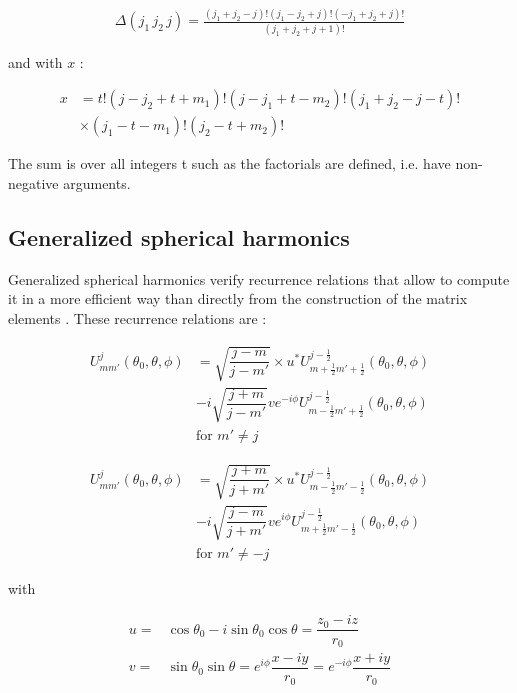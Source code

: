 \documentclass[12pt]{article}
\begin{document}
\begin{eqnarray}
\Delta \left(j_1\, j_2\, j\right) = \frac{\left(j_1+j_2-j\right)! \left(j_1-j_2+j\right)! \left(-j_1+j_2+j\right)!}{\left(j_1+j_2+j+1\right)!}
\end{eqnarray}

and with $x$ :

\begin{eqnarray}
x & =t!\left(j-j_2+t+m_1\right)! \left(j-j_1+t-m_2\right)! \left(j_1+j_2-j-t\right)! \\
& \times \left(j_1-t-m_1\right)! \left(j_2-t+m_2 \right)! \nonumber
\end{eqnarray}

The sum is over all integers t such as the factorials are defined, i.e. have non-negative arguments.

 \subsection{Generalized spherical harmonics}

Generalized spherical harmonics verify recurrence relations that allow to compute it in a more efficient way than directly from the construction of the matrix elements \cite{Bartok_01}. These recurrence relations are :

\begin{eqnarray} \label{eqn:gsh_b7}
U^j_{m m'}\left(\theta_0,\theta,\phi\right) & =\sqrt{\dfrac{j-m}{j-m'}}\times u^\ast U^{j-\frac{1}{2}}_{m+\frac{1}{2} m'+\frac{1}{2}}\left(\theta_0,\theta,\phi\right) \nonumber \\ 
& - i \sqrt{\dfrac{j+m}{j-m'}}v e^{-i\phi}U^{j-\frac{1}{2}}_{m-\frac{1}{2} m'+\frac{1}{2}}\left(\theta_0,\theta,\phi\right) \\
& \text{for } m' \neq j \nonumber
\end{eqnarray}


\begin{eqnarray} \label{eqn:gsh_b8}
U^j_{m m'}\left(\theta_0,\theta,\phi\right) & =\sqrt{\dfrac{j+m}{j+m'}}\times u^\ast U^{j-\frac{1}{2}}_{m-\frac{1}{2} m'-\frac{1}{2}}\left(\theta_0,\theta,\phi\right) \nonumber \\ 
& - i \sqrt{\dfrac{j-m}{j+m'}}v e^{i\phi}U^{j-\frac{1}{2}}_{m+\frac{1}{2} m'-\frac{1}{2}}\left(\theta_0,\theta,\phi\right) \\
& \text{for } m' \neq -j \nonumber
\end{eqnarray}

with 

\begin{eqnarray} \label{eqn:uandv}
u =& \cos{\theta_0}-i \sin{\theta_0}\cos{\theta}=\dfrac{z_0-iz}{r_0} \\
v =& \sin{\theta_0}\sin{\theta} = e^{i \phi} \dfrac{x-i y}{r_0}=e^{-i \phi} \dfrac{x+i y}{r_0}
\end{eqnarray}
\end{document}
